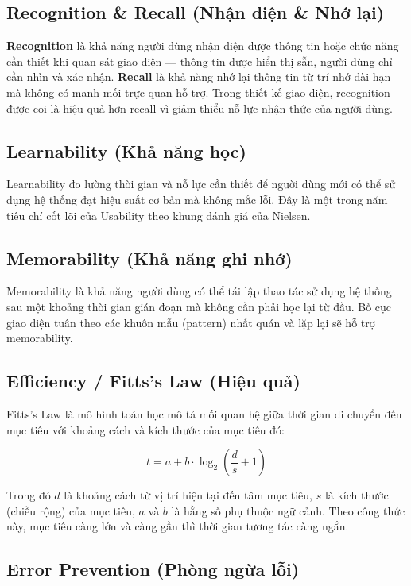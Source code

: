 \subsection{Recognition \& Recall (Nhận diện \& Nhớ lại)}

\textbf{Recognition} là khả năng người dùng nhận diện được thông tin hoặc chức năng cần thiết khi quan sát giao diện --- thông tin được hiển thị sẵn, người dùng chỉ cần nhìn và xác nhận. \textbf{Recall} là khả năng nhớ lại thông tin từ trí nhớ dài hạn mà không có manh mối trực quan hỗ trợ. Trong thiết kế giao diện, recognition được coi là hiệu quả hơn recall vì giảm thiểu nỗ lực nhận thức của người dùng.

\subsection{Learnability (Khả năng học)}

Learnability đo lường thời gian và nỗ lực cần thiết để người dùng mới có thể sử dụng hệ thống đạt hiệu suất cơ bản mà không mắc lỗi. Đây là một trong năm tiêu chí cốt lõi của Usability theo khung đánh giá của Nielsen.

\subsection{Memorability (Khả năng ghi nhớ)}

Memorability là khả năng người dùng có thể tái lập thao tác sử dụng hệ thống sau một khoảng thời gian gián đoạn mà không cần phải học lại từ đầu. Bố cục giao diện tuân theo các khuôn mẫu (pattern) nhất quán và lặp lại sẽ hỗ trợ memorability.

\subsection{Efficiency / Fitts's Law (Hiệu quả)}

Fitts's Law là mô hình toán học mô tả mối quan hệ giữa thời gian di chuyển đến mục tiêu với khoảng cách và kích thước của mục tiêu đó:

\[t = a + b \cdot \log_2\left(\frac{d}{s} + 1\right)\]

Trong đó $d$ là khoảng cách từ vị trí hiện tại đến tâm mục tiêu, $s$ là kích thước (chiều rộng) của mục tiêu, $a$ và $b$ là hằng số phụ thuộc ngữ cảnh. Theo công thức này, mục tiêu càng lớn và càng gần thì thời gian tương tác càng ngắn.

\subsection{Error Prevention (Phòng ngừa lỗi)}

